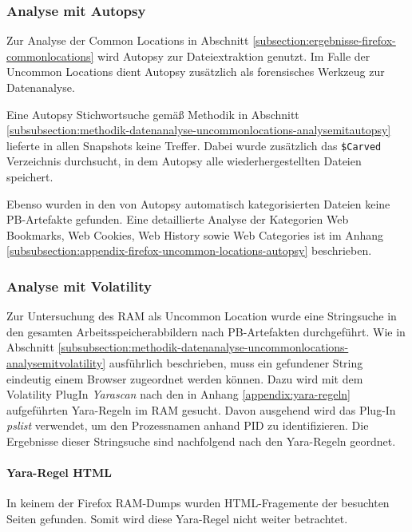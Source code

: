 \subsubsection*{Analyse mit Autopsy}
\label{subsubsection:ergebnisse-firefox-uncommonlocations-analysemitautopsy}
Zur Analyse der Common Locations in Abschnitt \ref{subsection:ergebnisse-firefox-commonlocations} wird Autopsy zur Dateiextraktion genutzt. Im Falle der Uncommon Locations dient Autopsy zusätzlich als forensisches Werkzeug zur Datenanalyse.

Eine Autopsy Stichwortsuche gemäß Methodik in Abschnitt \ref{subsubsection:methodik-datenanalyse-uncommonlocations-analysemitautopsy} lieferte in allen Snapshots keine Treffer. Dabei wurde zusätzlich das \texttt{\$Carved} Verzeichnis durchsucht, in dem Autopsy alle wiederhergestellten Dateien speichert.

Ebenso wurden in den von Autopsy automatisch kategorisierten Dateien keine PB-Artefakte gefunden. Eine detaillierte Analyse der Kategorien \glqq{}Web Bookmarks\grqq{}, \glqq{}Web Cookies\grqq{}, \glqq{}Web History\grqq{} sowie \glqq{}Web Categories\grqq{} ist im Anhang \ref{subsubsection:appendix-firefox-uncommon-locations-autopsy} beschrieben.

\subsubsection*{Analyse mit Volatility}
\label{subsubsection:ergebnisse-firefox-uncommonlocations-analysemitvolatility}
Zur Untersuchung des RAM als Uncommon Location wurde eine Stringsuche in den gesamten Arbeitsspeicherabbildern nach PB-Artefakten durchgeführt.
Wie in Abschnitt \ref{subsubsection:methodik-datenanalyse-uncommonlocations-analysemitvolatility} ausführlich beschrieben, muss ein gefundener String eindeutig einem Browser zugeordnet werden können. 
Dazu wird mit dem Volatility PlugIn \textit{Yarascan} nach den in Anhang \ref{appendix:yara-regeln} aufgeführten Yara-Regeln im RAM gesucht. Davon ausgehend wird das Plug-In \textit{pslist} verwendet, um den Prozessnamen anhand PID zu identifizieren.
Die Ergebnisse dieser Stringsuche sind nachfolgend nach den Yara-Regeln geordnet.

\paragraph*{Yara-Regel \glqq{}HTML\grqq{}}
In keinem der Firefox RAM-Dumps wurden HTML-Fragemente der besuchten Seiten gefunden. Somit wird diese Yara-Regel nicht weiter betrachtet.

